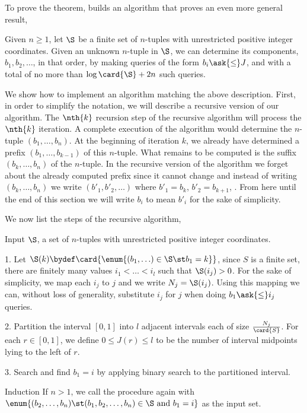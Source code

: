 To prove the theorem, \citet{fredman:1976} builds an algorithm that proves an
even more general result,

\begin{lemma}
Given $n \ge 1$, let $\S$ be a finite set of $n$-tuples with unrestricted
positive integer coordinates. Given an unknown $n$-tuple in $\S$, we can
determine its components, $b_1, b_2, \ldots$, in that order, by making queries
of the form \(b_i \ask{\le} J\), and with a total of no more than $\log \card{\S}
+ 2n$ such queries.
\end{lemma}

We show how to implement an algorithm matching the above description. First, in
order to simplify the notation, we will describe a recursive version of our
algorithm. The $\nth{k}$ recursion step of the recursive algorithm will process
the $\nth{k}$ iteration. A complete execution of the algorithm would determine
the $n$-tuple $(b_1, \ldots, b_n)$.  At the beginning of iteration $k$, we
already have determined a prefix $(b_1, \ldots, b_{k-1})$ of this $n$-tuple.
What remains to be computed is the suffix $(b_k, \ldots, b_n)$ of the
$n$-tuple. In the recursive version of the algorithm we forget about the
already computed prefix since it cannot change and instead of writing $(b_k,
\ldots, b_n)$ we write $(b'_1, b'_2, \ldots)$ where $b'_1 = b_k$, $b'_2 =
b_{k+1}$, \etc. From here until the end of this section we will write $b_i$ to
mean $b'_i$ for the sake of simplicity.

We now list the steps of the recursive algorithm,

\begin{algorithm}

\item[Input] $\S$, a set of $n$-tuples with unrestricted positive integer
coordinates.

\item[1.] Let $\S(k) \bydef \card{\enum{(b_1, \ldots) \in \S \st b_1 = k}}$,
since $S$ is a finite set, there are finitely many values $i_1 < \ldots < i_l$
such that $\S(i_j) > 0$. For the sake of simplicity, we map each $i_j$ to $j$
and we write $N_j = \S(i_j)$. Using this mapping we can, without loss of
generality, substitute $i_j$ for $j$ when doing $b_1 \ask{\le} i_j$
queries.

\item[2.] Partition the interval $[0,1]$ into $l$ adjacent intervals each of
size $\frac{N_j}{\card{S}}$. For each $r \in [0,1]$, we define $0 \le J(r) \le
l$ to be the number of interval midpoints lying to the left of $r$.

\item[3.] Search and find $b_1 = i$ by applying binary search to the partitioned
interval.

\item[Induction] If $n > 1$, we call the procedure again with\\
$\enum{(b_2, \ldots, b_n) \st (b_1, b_2, \ldots, b_n) \in \S \text{ and } b_1 =
i}$ as the input set.

\end{algorithm}

